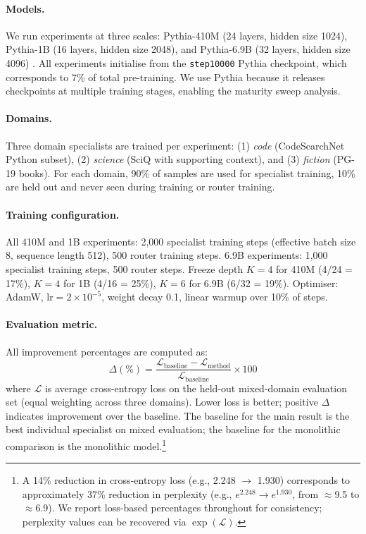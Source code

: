 \documentclass{article}
\begin{document}
\paragraph{Models.} We run experiments at three scales: Pythia-410M (24 layers, hidden size 1024), Pythia-1B (16 layers, hidden size 2048), and Pythia-6.9B (32 layers, hidden size 4096) \citep{biderman2023pythia}. All experiments initialise from the \texttt{step10000} Pythia checkpoint, which corresponds to 7\% of total pre-training. We use Pythia because it releases checkpoints at multiple training stages, enabling the maturity sweep analysis.

\paragraph{Domains.} Three domain specialists are trained per experiment: (1) \emph{code} (CodeSearchNet Python subset), (2) \emph{science} (SciQ with supporting context), and (3) \emph{fiction} (PG-19 books). For each domain, 90\% of samples are used for specialist training, 10\% are held out and never seen during training or router training.

\paragraph{Training configuration.} All 410M and 1B experiments: 2,000 specialist training steps (effective batch size 8, sequence length 512), 500 router training steps. 6.9B experiments: 1,000 specialist training steps, 500 router steps. Freeze depth $K=4$ for 410M (4/24 = 17\%), $K=4$ for 1B (4/16 = 25\%), $K=6$ for 6.9B (6/32 = 19\%). Optimiser: AdamW, $\text{lr}=2\times10^{-5}$, weight decay 0.1, linear warmup over 10\% of steps.

\paragraph{Evaluation metric.} All improvement percentages are computed as:
\[
\Delta(\%) = \frac{\mathcal{L}_\text{baseline} - \mathcal{L}_\text{method}}{\mathcal{L}_\text{baseline}} \times 100
\]
where $\mathcal{L}$ is average cross-entropy loss on the held-out mixed-domain evaluation set (equal weighting across three domains). Lower loss is better; positive $\Delta$ indicates improvement over the baseline. The baseline for the main result is the best individual specialist on mixed evaluation; the baseline for the monolithic comparison is the monolithic model.\footnote{A 14\% reduction in cross-entropy loss (e.g., 2.248 $\to$ 1.930) corresponds to approximately 37\% reduction in perplexity (e.g., $e^{2.248} \to e^{1.930}$, from $\approx$9.5 to $\approx$6.9). We report loss-based percentages throughout for consistency; perplexity values can be recovered via $\exp(\mathcal{L})$.}
\end{document}
